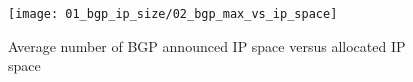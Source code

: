 \begin{figure}[htbp]
	\centering
		\texttt{[image: 01\_bgp\_ip\_size/02\_bgp\_max\_vs\_ip\_space]}
	\caption{Average number of BGP announced IP space versus allocated IP space}
	\label{fig:BGP vs RIR space}
\end{figure}
%
